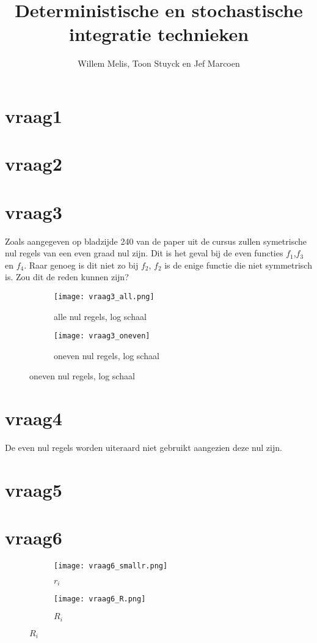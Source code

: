\documentclass[11pt]{article} %
\title{Deterministische en stochastische integratie technieken}
\author{Willem Melis, Toon Stuyck en Jef Marcoen}
\begin{document}
\maketitle
\newpage
\newpage
\section{vraag1}
\section{vraag2}
\section{vraag3}

Zoals aangegeven op bladzijde 240 van de paper uit de cursus zullen symetrische nul regels van een even graad nul zijn. Dit is het geval bij de even functies $f_1$,$f_3$ en $f_4$. Raar genoeg is dit niet zo bij $f_2$, $f_2$ is de enige functie die niet symmetrisch is. Zou dit de reden kunnen zijn?

\begin{figure}[H]
	\centering
	\begin{subfigure}[b]{0.45\textwidth}
		\texttt{[image: vraag3\_all.png]}
		\caption{alle nul regels, log schaal}
	\end{subfigure}
	\begin{subfigure}[b]{0.45\textwidth}
		\texttt{[image: vraag3\_oneven]}
		\caption{oneven nul regels, log schaal}
	\end{subfigure}
\end{figure}

\section{vraag4}
De even nul regels worden uiteraard niet gebruikt aangezien deze nul zijn.
\section{vraag5}
\section{vraag6}
\begin{figure}[H]
	\centering
	\begin{subfigure}[b]{0.45\textwidth}
		\texttt{[image: vraag6\_smallr.png]}
		\caption{$r_i$}
	\end{subfigure}
	\begin{subfigure}[b]{0.45\textwidth}
		\texttt{[image: vraag6\_R.png]}
		\caption{$R_i$}
	\end{subfigure}
\end{figure}

			
\end{document}
